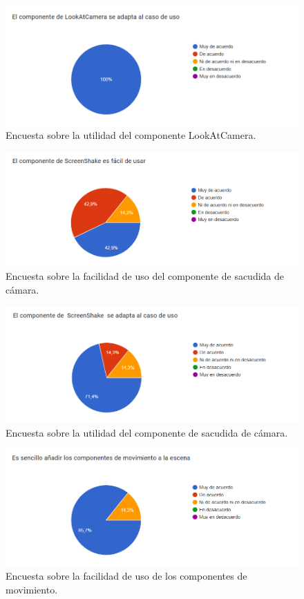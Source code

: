 \begin{figure}[H]
  \centering
  \includegraphics[width=450px,clip=true]{CUESTIONARIO_25.png}
  \caption{Encuesta sobre la utilidad del componente LookAtCamera.}
  \label{fig:CUESTIONARIO_25}
\end{figure}
\raggedbottom

\begin{figure}[H]
  \centering
  \includegraphics[width=450px,clip=true]{CUESTIONARIO_26.png}
  \caption{Encuesta sobre la facilidad de uso del componente de sacudida de cámara.}
  \label{fig:CUESTIONARIO_26}
\end{figure}
\raggedbottom

\begin{figure}[H]
  \centering
  \includegraphics[width=450px,clip=true]{CUESTIONARIO_27.png}
  \caption{Encuesta sobre la utilidad del componente de sacudida de cámara.}
  \label{fig:CUESTIONARIO_27}
\end{figure}
\raggedbottom

\begin{figure}[H]
  \centering
  \includegraphics[width=450px,clip=true]{CUESTIONARIO_28.png}
  \caption{Encuesta sobre la facilidad de uso de los componentes de movimiento.}
  \label{fig:CUESTIONARIO_28}
\end{figure}
\raggedbottom

